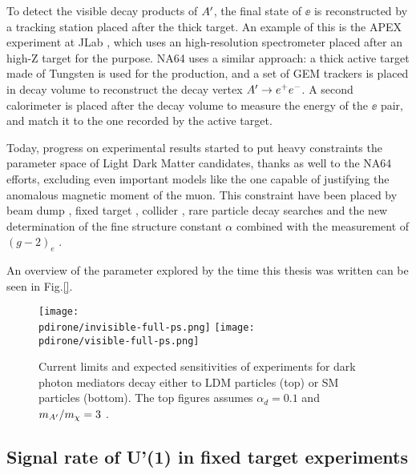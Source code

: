 To detect the visible decay products of $A'$, the final state of $\ee$ is reconstructed by a tracking station placed after the thick target. An example of this is the APEX experiment at JLab \cite{apex}, which uses an high-resolution spectrometer placed after an high-Z target for the purpose. NA64 uses a similar approach: a thick active target made of Tungsten is used for the production, and a set of GEM trackers is placed in decay volume to reconstruct the decay vertex $A' \to e^+e^-$. A second calorimeter is placed after the decay volume to measure the energy of the $\ee$ pair, and match it to the one recorded by the active target.

Today, progress on experimental results started to put heavy constraints the parameter space of Light Dark Matter candidates, thanks as well to the NA64 efforts, excluding even important models like the one capable of justifying the anomalous magnetic moment of the muon. This constraint have been placed by beam dump \cite{jdb, charm, PhysRevLett.59.755, e137, konaka, PhysRevLett.67.2942, dav,  ath, nomad, e787, essig1, blum,sg1, blum1, sarah1}, fixed target \cite{apex,merkel,merkel1}, collider \cite{babar, curt, babar1}, rare particle decay searches \cite{sindrum, kloe, sg2, kloe2, wasa, hades, phenix, e949, na48, pol, kloe3} and the new determination of the fine structure constant $\alpha$ combined with the measurement of $(g-2)_e$ \cite{Parker191,PhysRevLett.100.120801}.

An overview of the parameter explored by the time this thesis was written can be seen in Fig.\ref{}.

\begin{figure}[bth!]
  \centering
  \texttt{[image: \\pdirone/invisible-full-ps.png]}
  \texttt{[image: \\pdirone/visible-full-ps.png]}
  \caption[Current exclusion limit and project for Dark Photon in the physics community]{Current limits and expected sensitivities of experiments for dark photon mediators decay either to LDM particles (top) or SM particles (bottom). The top figures assumes $\alpha_d = 0.1$ and $m_{A'}/m_{\chi} = 3$ \cite{pbc-book}.}
  \label{fig:dmplane-overview}
\end{figure}

\subsection{Signal rate of U'(1) in fixed target experiments}
\label{ch1:sec:dm-u1model}

